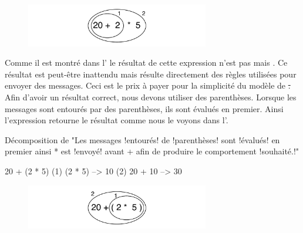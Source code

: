 \documentclass[a4paper,10pt,twoside]{book}
\begin{document}
\begin{figure}
\begin{center}\includegraphics[width=8cm]{ucompoNoBracketPar}\end{center}
\end{figure}
\noindent
Comme il est montré dans l' le résultat de
cette expression n'est pas  mais . Ce résultat est
peut-être inattendu mais résulte directement des règles
utilisées pour envoyer des messages. Ceci est le prix à payer pour
la simplicité du modèle de \st. Afin d'avoir un résultat
correct, nous devons utiliser des parenthèses. Lorsque les messages
sont entourés par des parenthèses, ils sont évalués en
premier. Ainsi l'expression  retourne le résultat
comme nous le voyons dans l'.

\begin{example}[mathcorrect]{Décomposition de }{}
"Les messages !entourés! de !parenthèses! sont !évalués! en premier ainsi * est !envoyé! avant + afin de produire le comportement !souhaité.!"

    20 + (2 * 5) 
(1)        (2 * 5) --> 10
(2) 20 + 10      --> 30
\end{example}

\begin{figure}
\begin{center}
\includegraphics[width=8cm]{ucompoNumberBracket}
\end{center}
\end{figure}


\end{document}
